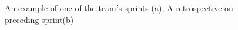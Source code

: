 \begin{figure}[!h]
\centering
{} 
\caption{An example of one of the team's sprints (a), A retrospective on preceding sprint(b)} 
\label{fig:estimation} 
\end{figure} 
